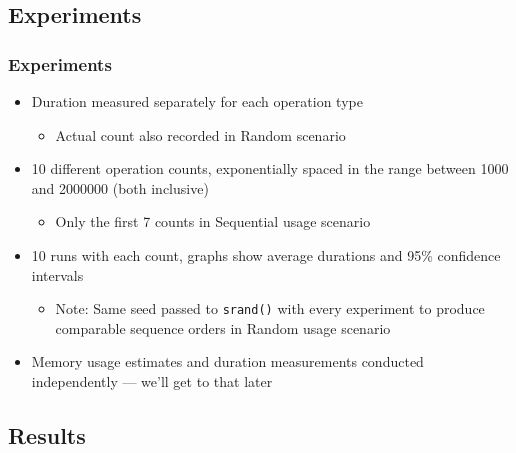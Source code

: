 \documentclass[compress]{beamer}
\begin{document}
\subsection{Experiments}


\begin{frame}
\frametitle{Experiments}
\begin{itemize}

  \item Duration measured separately for each operation type
  \begin{itemize}
    \item Actual count also recorded in Random scenario
  \end{itemize}

  \item 10 different operation counts, exponentially spaced in the range between
  1000 and 2000000 (both inclusive)

  \begin{itemize}

    \item Only the first 7 counts in Sequential usage scenario

  \end{itemize}

  \item 10 runs with each count, graphs show average durations and 95\%
  confidence intervals

  \begin{itemize}

    \item Note: Same seed passed to \texttt{srand()} with every experiment to
    produce comparable sequence orders in Random usage scenario

  \end{itemize}

  \item Memory usage estimates and duration measurements conducted independently
  --- we'll get to that later

\end{itemize}
\end{frame}

\subsection{Results}
\end{document}
